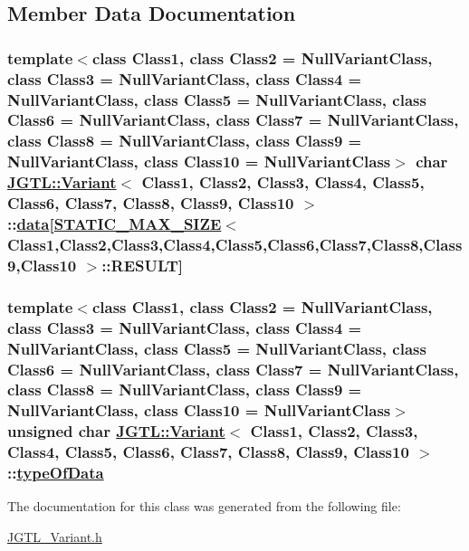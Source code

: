 \subsection{Member Data Documentation}
\hypertarget{class_j_g_t_l_1_1_variant_1cc3c7fe89182f0ba7915d5d2de199db}{
\subsubsection[data]{\setlength{\rightskip}{0pt plus 5cm}template$<$class Class1, class Class2 = Null\-Variant\-Class, class Class3 = Null\-Variant\-Class, class Class4 = Null\-Variant\-Class, class Class5 = Null\-Variant\-Class, class Class6 = Null\-Variant\-Class, class Class7 = Null\-Variant\-Class, class Class8 = Null\-Variant\-Class, class Class9 = Null\-Variant\-Class, class Class10 = Null\-Variant\-Class$>$ char \hyperlink{class_j_g_t_l_1_1_variant}{JGTL::Variant}$<$ Class1, Class2, Class3, Class4, Class5, Class6, Class7, Class8, Class9, Class10 $>$::\hyperlink{class_j_g_t_l_1_1_variant_1cc3c7fe89182f0ba7915d5d2de199db}{data}\mbox{[}\hyperlink{struct_j_g_t_l_1_1_s_t_a_t_i_c___m_a_x___s_i_z_e}{STATIC\_\-MAX\_\-SIZE}$<$ Class1,Class2,Class3,Class4,Class5,Class6,Class7,Class8,Class9,Class10 $>$::RESULT\mbox{]}}}
\label{class_j_g_t_l_1_1_variant_1cc3c7fe89182f0ba7915d5d2de199db}


\hypertarget{class_j_g_t_l_1_1_variant_c9ace9530818f4e6ee22ac3cb539a5f2}{
\subsubsection[typeOfData]{\setlength{\rightskip}{0pt plus 5cm}template$<$class Class1, class Class2 = Null\-Variant\-Class, class Class3 = Null\-Variant\-Class, class Class4 = Null\-Variant\-Class, class Class5 = Null\-Variant\-Class, class Class6 = Null\-Variant\-Class, class Class7 = Null\-Variant\-Class, class Class8 = Null\-Variant\-Class, class Class9 = Null\-Variant\-Class, class Class10 = Null\-Variant\-Class$>$ unsigned char \hyperlink{class_j_g_t_l_1_1_variant}{JGTL::Variant}$<$ Class1, Class2, Class3, Class4, Class5, Class6, Class7, Class8, Class9, Class10 $>$::\hyperlink{class_j_g_t_l_1_1_variant_c9ace9530818f4e6ee22ac3cb539a5f2}{type\-Of\-Data}}}
\label{class_j_g_t_l_1_1_variant_c9ace9530818f4e6ee22ac3cb539a5f2}




The documentation for this class was generated from the following file:\begin{CompactItemize}
\item 
\hyperlink{_j_g_t_l___variant_8h}{JGTL\_\-Variant.h}\end{CompactItemize}

